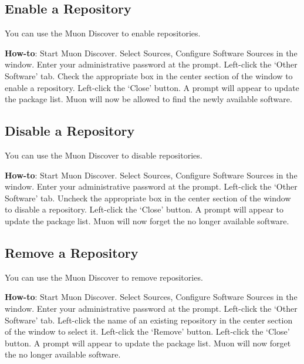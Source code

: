 \documentclass[letterpaper,10pt,english]{sphinxmanual}
\begin{document}


\subsection{Enable a Repository}
\label{docs/repositories:enable-a-repository}
You can use the Muon Discover to enable repositories.

\textbf{How-to}: Start Muon Discover. Select Sources, Configure Software Sources in the window. Enter your administrative password at the prompt. Left-click the `Other Software' tab. Check the appropriate box in the center section of the window to enable a repository. Left-click the `Close' button. A prompt will appear to update the package list. Muon will now be allowed to find the newly available software.


\subsection{Disable a Repository}
\label{docs/repositories:disable-a-repository}
You can use the Muon Discover to disable repositories.

\textbf{How-to}: Start Muon Discover. Select Sources, Configure Software Sources in the window. Enter your administrative password at the prompt. Left-click the `Other Software' tab. Uncheck the appropriate box in the center section of the window to disable a repository. Left-click the `Close' button. A prompt will appear to update the package list. Muon will now forget the no longer available software.


\subsection{Remove a Repository}
\label{docs/repositories:remove-a-repository}
You can use the Muon Discover to remove repositories.

\textbf{How-to}: Start Muon Discover. Select Sources, Configure Software Sources in the window. Enter your administrative password at the prompt. Left-click the `Other Software' tab. Left-click the name of an existing repository in the center section of the window to select it. Left-click the `Remove' button. Left-click the `Close' button. A prompt will appear to update the package list. Muon will now forget the no longer available software.
\end{document}
